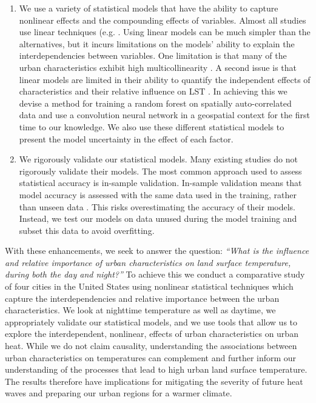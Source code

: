 \documentclass[final,3p,times,onecolumn,sort&compress]{elsarticle}
\begin{document}
\begin{enumerate}
    \item We use a variety of statistical models that have the ability to capture nonlinear effects and the compounding effects of variables.
    Almost all studies use linear techniques (e.g. \cite{Li2017-yl, Peng2012-iy, Wicki2017-fv,Zhou2014-wc,Peng2018-cp,Echevarria_Icaza2016-fr,Chun2017-mm,Chun2018-so,Wang2019-tree,Wang2019-water, Galletti2019-wa}.
    Using linear models can be much simpler than the alternatives, but it incurs limitations on the models' ability to explain the interdependencies between variables. 
    One limitation is that many of the urban characteristics exhibit high multicollinearity \citep{Zhou2014-wc}.
    A second issue is that linear models are limited in their ability to quantify the independent effects of characteristics and their relative influence on LST \citep{Peng2018-cp, Zhou2014-wc}.
    In achieving this we devise a method for training a random forest on spatially auto-correlated data and use a convolution neural network in a geospatial context for the first time to our knowledge.
    We also use these different statistical models to present the model uncertainty in the effect of each factor.
    
    \item We rigorously validate our statistical models.
    Many existing studies do not rigorously validate their models.
    The most common approach used to assess statistical accuracy is in-sample validation.
    In-sample validation means that model accuracy is assessed with the same data used in the training, rather than unseen data \cite{Shmueli2011-wd}.
    This risks overestimating the accuracy of their models.
    Instead, we test our models on data unused during the model training and subset this data to avoid overfitting.
\end{enumerate}

With these enhancements, we seek to answer the question: \textit{``What is the influence and relative importance of urban characteristics on land surface temperature, during both the day and night?''}
To achieve this we conduct a comparative study of four cities in the United States using nonlinear statistical techniques which capture the interdependencies and relative importance between the urban characteristics.
We look at nighttime temperature as well as daytime, we appropriately validate our statistical models, and we use tools that allow us to explore the interdependent, nonlinear, effects of urban characteristics on urban heat.
While we do not claim causality, understanding the associations between urban characteristics on temperatures can complement and further inform our understanding of the processes that lead to high urban land surface temperature.
The results therefore have implications for mitigating the severity of future heat waves and preparing our urban regions for a warmer climate.
\end{document}
